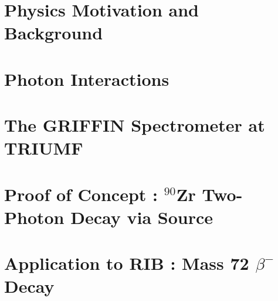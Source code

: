 \documentclass[letterpaper,12pt]{article}  %
\begin{document}
\chapter{Physics Motivation and Background}


\chapter{Photon Interactions}


\chapter{The GRIFFIN Spectrometer at TRIUMF}


\chapter{Proof of Concept : $^{90}$Zr Two-Photon Decay via Source}
\label{sec:proof_of_concept_90sr}


\chapter{Application to RIB : Mass 72 $\beta^-$ Decay}




\backmatter






%
\end{document}
